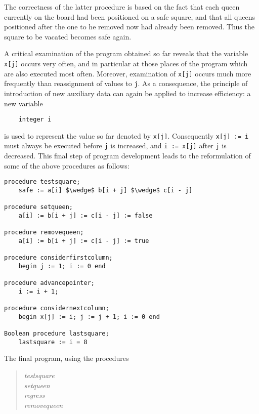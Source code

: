 The correctness of the latter procedure is based on the fact that each queen
currently on the board had been positioned on a safe square, and that all
queens positioned after the one to he removed now had already been removed.
Thus the square to be vacated becomes safe again.

A critical examination of the program obtained so far reveals that the variable
\verb|x[j]| occurs very often, and in particular at those places of the program
which are also executed most often.  Moreover, examination of \verb|x[j]|
occurs much more frequently than reassignment of values to \verb|j|.  As a
consequence, the principle of introduction of new auxiliary data can again be
applied to increase efficiency: a new variable

\begin{lstlisting}
    integer i
\end{lstlisting}

is used to represent the value so far denoted by \verb|x[j]|.  Consequently
\verb|x[j] := i| must always be executed before \verb|j| is increased, and
\verb|i := x[j]| after \verb|j| is decreased.  This final step of program
development leads to the reformulation of some of the above procedures as
follows:

\begin{lstlisting}
procedure testsquare;
    safe := a[i] $\wedge$ b[i + j] $\wedge$ c[i - j]

procedure setqueen;
    a[i] := b[i + j] := c[i - j] := false

procedure removequeen;
    a[i] := b[i + j] := c[i - j] := true

procedure considerfirstcolumn;
    begin j := 1; i := 0 end

procedure advancepointer;
    i := i + 1;

procedure considernextcolumn;
    begin x[j] := i; j := j + 1; i := 0 end

Boolean procedure lastsquare;
    lastsquare := i = 8
\end{lstlisting}

The final program, using the procedures

\begin{quote}
\emph{testsquare}\\
\emph{setqueen}\\
\emph{regress}\\
\emph{removequeen}\\
\end{quote}


